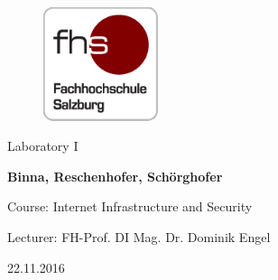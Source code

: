 \begin{titlepage}

\hspace{7cm}

\begin{figure}[!ht]
	\centering
	\includegraphics[width=0.3\textwidth]{fhs_logo_web.png}
\end{figure}

\begin{center}
	\vspace{2cm}
	\Huge Laboratory I
	
	\Large{\bf\large Binna, Reschenhofer, Schörghofer}
	\vspace{1cm}

	\large Course: Internet Infrastructure and Security 
	
	\large Lecturer: FH-Prof. DI Mag. Dr. Dominik Engel 
	
	\large 22.11.2016
\end{center}

\end{titlepage}